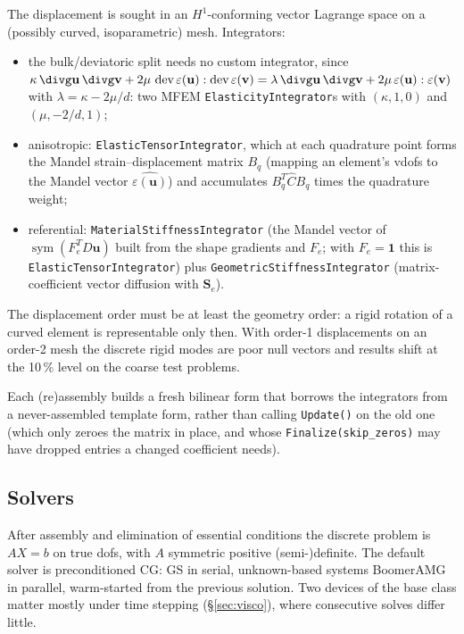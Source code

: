 \documentclass[11pt]{article}
\numberwithin{equation}{section}
\theoremstyle{remark}
\newcommand{\eps}{\varepsilon}
\newcommand{\sym}{\operatorname{sym}}
\newcommand{\dev}{\operatorname{dev}}
\newcommand{\vu}{\mathbf{u}}
\newcommand{\vv}{\mathbf{v}}
\newcommand{\Se}{\mathbf{S}_e}
\newcommand{\code}[1]{\texttt{#1}}
\begin{document}
The displacement is sought in an $H^1$-conforming vector Lagrange space
on a (possibly curved, isoparametric) mesh. Integrators:
\begin{itemize}
\item the bulk/deviatoric split needs no custom integrator, since
  $\kappa\,\divg\vu\,\divg\vv + 2\mu\,\dev\eps(\vu):\dev\eps(\vv) =
  \lambda\,\divg\vu\,\divg\vv + 2\mu\,\eps(\vu):\eps(\vv)$ with
  $\lambda = \kappa - 2\mu/d$: two MFEM \code{ElasticityIntegrator}s with
  $(\kappa, 1, 0)$ and $(\mu, -2/d, 1)$;
\item anisotropic: \code{ElasticTensorIntegrator}, which at each
  quadrature point forms the Mandel strain--displacement matrix $B_q$
  (mapping an element's vdofs to the Mandel vector $\widehat{\eps(\vu)}$)
  and accumulates $B_q^T\hat C B_q$ times the quadrature weight;
\item referential: \code{MaterialStiffnessIntegrator} (the Mandel vector of
  $\sym(F_e^TD\vu)$ built from the shape gradients and $F_e$; with
  $F_e = \mathbf{1}$ this is \code{ElasticTensorIntegrator}) plus
  \code{GeometricStiffnessIntegrator} (matrix-coefficient vector
  diffusion with $\Se$).
\end{itemize}
The displacement order must be at least the geometry order: a rigid
rotation of a curved element is representable only then. With order-1
displacements on an order-2 mesh the discrete rigid modes are poor null
vectors and results shift at the 10\,\% level on the coarse test problems.

Each (re)assembly builds a fresh bilinear form that borrows the
integrators from a never-assembled template form, rather than calling
\code{Update()} on the old one (which only zeroes the matrix in place, and
whose \code{Finalize(skip\_zeros)} may have dropped entries a changed
coefficient needs).

\subsection{Solvers}

After assembly and elimination of essential conditions the discrete
problem is $AX = b$ on true dofs, with $A$ symmetric positive
(semi-)definite. The default solver is preconditioned CG: GS in serial,
unknown-based systems BoomerAMG in parallel, warm-started from the
previous solution. Two devices of the base class matter mostly under time
stepping (\S\ref{sec:visco}), where consecutive solves differ little.
\end{document}
